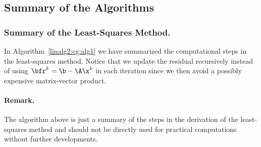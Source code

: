 \subsection{Summary of the Algorithms}

\subsubsection{Summary of the Least-Squares Method.}
In Algorithm~\ref{linalg2:cg:alg1} we have summarized
the computational steps in the least-squares method.
Notice that we update the residual recursively instead of using
$\bfr^k=\b - \A\x^k$ in each iteration since we then avoid a possibly
expensive matrix-vector product.



\paragraph{Remark.} The algorithm above is just a summary of the
steps in the derivation of the least-squares method and should not be
directly used for practical computations without further developments.

